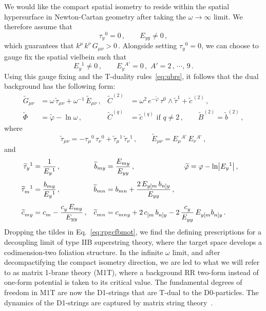\documentclass[11pt]{article}
\newcommand{\be}{\begin{equation}}
\newcommand{\ee}{\end{equation}}
\renewcommand{\tilde}[1]{\widetilde{#1}}
\begin{document}
We would like the compact spatial isometry to reside within the spatial hypersurface in Newton-Cartan geometry after taking the $\omega \rightarrow \infty$ limit. 
We therefore assume that 
%
\be
    \tau_y{}^0 = 0\,,
        \qquad%
    E_{yy} \neq 0\,,
\ee
%
which guarantees that $k^\mu \, k^\nu \, G_{\mu\nu} > 0$\,. 
Alongside setting $\tau_y{}^0=0$, we can choose to gauge fix the spatial vielbein such that
%
\be
    E_y{}^1 \neq 0\,,
        \qquad
    E_y{}^{A'} = 0\,,
        \,\,
    A' = 2\,, \, \cdots, \, 9\,.
\ee
%
Using this gauge fixing and the T-duality rules~\eqref{eq:ubrs}, it follows that the dual background has the following form:
%
\begin{subequations} \label{eq:rpgcfbmot}
\begin{align}
    \tilde{G}_{\mu\nu} & = \omega \, \tilde{\tau}^{}_{\mu\nu} + \omega^{-1} \, \tilde{E}^{}_{\mu\nu}\,, 
        &
    \tilde{C}^{(2)} & = \omega^2 \, e^{-\tilde{\varphi}} \, \tau^0 \wedge \tilde{\tau}^1 + \tilde{c}^{\,(2)}\,, \\[4pt]
    \tilde{\Phi} & = \tilde{\varphi} - \ln \omega\,, 
        &
    \tilde{C}^{(q)} & = \tilde{c}^{(q)} \text{ if } q \neq 2\,,
        \qquad%
    \tilde{B}^{(2)} = \tilde{b}^{(2)}\,,
\end{align}
\end{subequations}
%
where 
%
\be
    \tilde{\tau}_{\mu\nu} = - \tau_\mu{}^0 \, \tau_\nu{}^0 + \tilde{\tau}_\mu{}^1 \, \tilde{\tau}_\nu{}^1\,, 
        \qquad%
    \tilde{E}_{\mu\nu} = E_\mu{}^{A'} \, E_\nu{}^{A'}\,,
\ee
%
and
%
\begin{subequations} \label{eq:mzttmot}
\begin{align}
    \tilde{\tau}_{y}{}^1 &= \frac{1}{E_{y}{}^1}\,, 
        &
    \tilde{b}_{my} & = \frac{E_{my}}{E_{yy}}\,,
    \hskip2.4truecm%
    \tilde{\varphi} = \varphi - \ln \bigl|E_{y}{}^1\bigr|\,,
     \\[4pt]
    \tilde{\tau}^{}_{m}{}^1 &= \frac{b_{my}}{E_{y}{}^1}\,,
        &
    \tilde{b}_{mn} & = b_{mn} + \frac{2 \, E_{y[m} \, b_{n]y}}{E_{yy}}\,,
        &
     \\[4pt]
    \tilde{c}^{}_{my} & = c^{}_m - \frac{c^{}_y \, E_{my}}{E_{yy}}\,, 
        &
    \tilde{c}^{}_{mn} & = c^{}_{mny} + 2 \, c^{}_{[m} \, b^{}_{n]y} - 2 \, \frac{c^{}_y}{E^{}_{yy}} \, E^{}_{y[m} b^{}_{n]y} \,.
\end{align}
\end{subequations}
%
Dropping the tildes in Eq.~\eqref{eq:rpgcfbmot}, we find the defining prescriptions for a decoupling limit of type IIB superstring theory, where the target space develops a codimension-two foliation structure. In the infinite $\omega$ limit, and after decompactifying the compact isometry direction, we are led to what we will refer to as matrix 1-brane theory (M1T), where a background RR two-form instead of one-form potential is taken to its critical value. The fundamental degrees of freedom in M1T are now the D1-strings that are T-dual to the D0-particles. 
The dynamics of the D1-strings are captured by matrix string theory~\cite{Motl:1997th, Dijkgraaf:1997vv}. 
\end{document}
